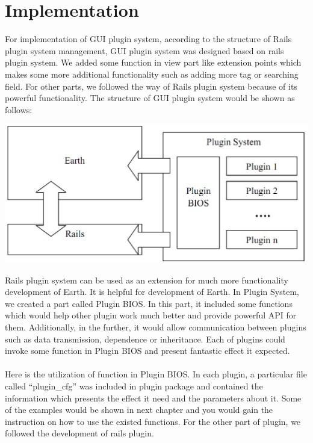 \documentclass[10pt,oneside]{article}
\begin{document}
\section{Implementation}

For implementation of GUI plugin system, according to the structure of Rails plugin system management, GUI plugin system was designed based on rails plugin system. We added some function in view part like extension points which makes some more additional functionality such as adding more tag or searching field. For other parts, we followed the way of Rails plugin system because of its powerful functionality. The structure of GUI plugin system would be shown as follows:\\
\begin{center}
 \includegraphics[width=150mm]{fig/flow.eps}\\
\end{center}
Rails plugin system can be used as an extension for much more functionality development of Earth. It is helpful for development of Earth. In Plugin System, we created a part called Plugin BIOS. In this part, it included some functions which would help other plugin work much better and provide powerful API for them. Additionally, in the further, it would allow communication between plugins such as data transmission, dependence or inheritance. Each of plugins could invoke some function in Plugin BIOS and present fantastic effect it expected.\\
\\
Here is the utilization of function in Plugin BIOS. In each plugin, a particular file called “plugin\_cfg” was included in plugin package and contained the information which presents the effect it need and the parameters about it. Some of the examples would be shown in next chapter and you would gain the instruction on how to use the existed functions. For the other part of plugin, we followed the development of rails plugin.\\
\end{document}
